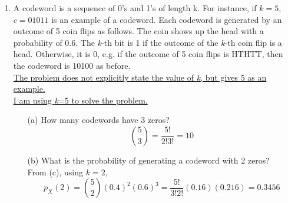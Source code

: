 \documentclass{report}
\begin{document}
\begin{enumerate}
\begin{itemize}
\end{itemize}
\item A codeword is a sequence of 0’s and 1’s of length k. For instance, if $k = 5$, $c = 01011$ is an example
of a codeword. Each codeword is generated by an outcome of 5 coin flips as follows. The coin shows
up the head with a probability of 0.6. The \textit{k}-th bit is 1 if the outcome of the \textit{k}-th coin flip is a head.
Otherwise, it is 0, e.g. if the outcome of 5 coin flips is HTHTT, then the codeword is 10100 as before.\\ \newline
\underline{The problem does not explicitly state the value of \textit{k}, but gives 5 as an example. }\\
\underline{I am using \textit{k}=5 to solve the problem. }
\begin{itemize}
  \item[(a)] How many codewords have 3 zeros? \\ \newline
  $$\binom{5}{3} = \frac{5!}{2!3!} = 10$$
  \item[(b)] What is the probability of generating a codeword with 2 zeros? \\ \newline
  From (c), using $k=2$,
  $$p_X(2) = \binom{5}{2}(0.4)^2(0.6)^{3} = \frac{5!}{3!2!}(0.16)(0.216) = 0.3456  $$


\end{itemize}
\end{enumerate}
\end{document}
